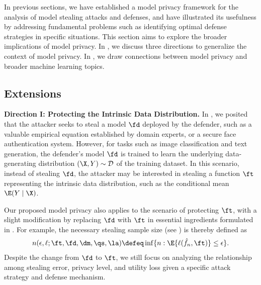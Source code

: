     In previous sections, we have established a model privacy framework for the analysis of model stealing attacks and defenses, and have illustrated its usefulness by addressing fundamental problems such as identifying optimal defense strategies in specific situations. This section aims to explore the broader implications of model privacy. 
    In , we discuss three directions to generalize the context of model privacy.
    In , we draw connections between model privacy and broader machine learning topics.
    
    \subsection{Extensions}\label{subsec:ext}
        
        \textbf{Direction I: Protecting the Intrinsic Data Distribution.} In , we posited that the attacker seeks to steal a model $\fd$ deployed by the defender, such as a valuable empirical equation established by domain experts, or a secure face  authentication system.
        However, for tasks such as image classification and text generation, the defender's model $\fd$ is trained to learn the underlying data-generating distribution $(\X, Y) \sim \mathcal{D}$ of the training dataset. In this scenario, instead of stealing $\fd$, the attacker may be interested in stealing a function $\ft$ representing the intrinsic data distribution, such as the conditional mean $\E (Y \mid \X)$. 

        Our proposed model privacy also applies to the scenario of protecting $\ft$, with a slight modification by replacing $\fd$ with $\ft$ in essential ingredients formulated in . For example, the necessary stealing sample size (see ) is thereby defined as
        \begin{align*}
            n(\epsilon,\ell;\ft,\fd,\dm,\qs,\la) \defeq \inf\{n:  \E \{\ell(\hat{f}_n, \ft) \}\leq \epsilon\}.
        \end{align*}
        Despite the change from $\fd$ to $\ft$, we still focus on analyzing the relationship among stealing error, privacy level, and utility loss given a specific attack strategy and defense mechanism.
        
